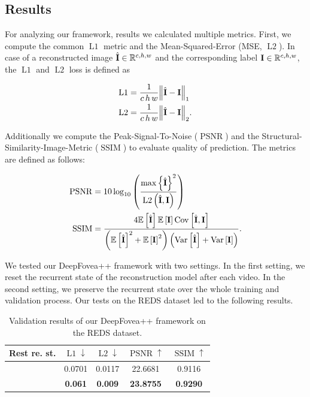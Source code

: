 \documentclass[10pt,twocolumn,letterpaper]{article}
\newcommand{\cmark}{\ding{51}}
\newcommand{\xmark}{\ding{55}}
\newcommand{\Tensor}[1]{\boldsymbol{\mathrm{\MakeUppercase{#1}}}}
\newcommand{\Set}[1]{\mathbb{#1}}
\newcommand{\Mean}[1]{\mathbb{E}\left[#1\right]}
\newcommand{\Var}[1]{\mathrm{Var}\left[#1\right]}
\newcommand{\Cov}[1]{\mathrm{Cov}\left[#1\right]}
\begin{document}
	\subsection{Results} \label{subsec:results}
	For analyzing our framework, results we calculated multiple metrics. First, we compute the common $\operatorname{L1}$ metric and the Mean-Squared-Error (MSE, $\operatorname{L2}$). In case of a reconstructed image $\hat{\Tensor{I}}\in\Set{R}^{c, h, w}$ and the corresponding label $\Tensor{I}\in\Set{R}^{c, h, w}$, the $\operatorname{L1}$ and $\operatorname{L2}$ loss is defined as
	
	\begin{align}
		\operatorname{L1} &= \frac{1}{c\, h\, w}\norm{\hat{\Tensor{I}} - \Tensor{I}}_{1}\\
		\operatorname{L2} &= \frac{1}{c\, h\, w}\norm{\hat{\Tensor{I}} - \Tensor{I}}_{2}.
	\end{align}
	
	Additionally we compute the Peak-Signal-To-Noise ($\operatorname{PSNR}$) and the Structural-Similarity-Image-Metric ($\operatorname{SSIM}$) \cite{ssmi} to evaluate quality of prediction. The metrics are defined as follows:
	
	\begin{align}
		\operatorname{PSNR}&=10 \log_{10}\left(\frac{\max\left\{\hat{\Tensor{I}}\right\}^2}{\operatorname{L2}\left(\hat{\Tensor{I}}, \Tensor{I}\right)} \right)\\
		\operatorname{SSIM}&=\frac{4\Mean{\hat{\Tensor{I}}}\Mean{\Tensor{I}}\Cov{\hat{\Tensor{I}}, \Tensor{I}}}{\left(\Mean{\hat{\Tensor{I}}}^2 + \Mean{\Tensor{I}}^2\right)\left(\Var{\hat{\Tensor{I}}} + \Var{\Tensor{I}}\right)}.
	\end{align}
	
	We tested our DeepFovea++ framework with two settings. In the first setting, we reset the recurrent state of the reconstruction model after each video. In the second setting, we preserve the recurrent state over the whole training and validation process. Our tests on the REDS dataset \cite{REDS} led to the following results.\\
	
	\begin{table}[!htbp]
		\centering
		\begin{center}
			\begin{tabular}{c|c|c|c|c}
				Rest re. st. & $\operatorname{L1}\downarrow$ & $\operatorname{L2}\downarrow$ & $\operatorname{PSNR}\uparrow$ & $\operatorname{SSIM}\uparrow$ \\ 
				\hline 
				\cmark & 0.0701 & 0.0117 & 22.6681 & 0.9116 \\
				\xmark & {\bf 0.061} & {\bf 0.009} & {\bf 23.8755} & {\bf 0.9290} \\ 
				\hline 
			\end{tabular} 
		\end{center}
		\caption{Validation results of our DeepFovea++ framework on the REDS dataset.}
		\label{tab:results}
	\end{table}
	
\end{document}
